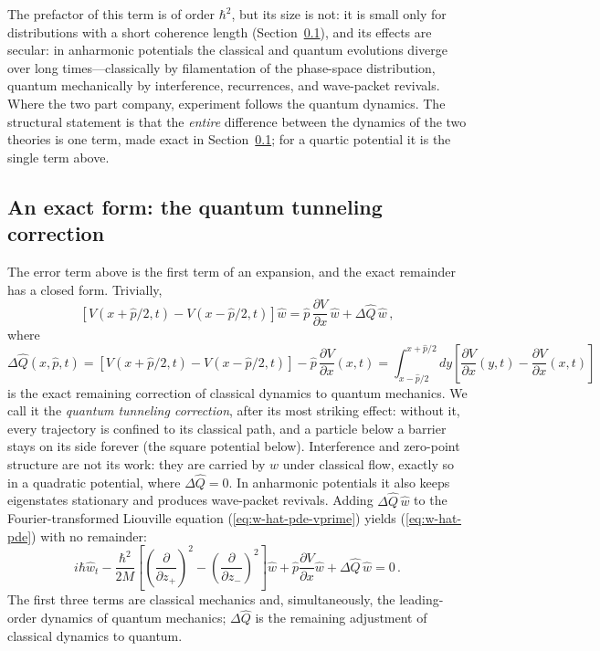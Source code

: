 \documentclass[12pt]{article}
\begin{document}
The prefactor of this term is of order $\hbar^2$, but its size is not: it is small only for distributions with a short coherence length (Section~\ref{sec:exact-correction}), and its effects are secular: in anharmonic potentials the classical and quantum evolutions diverge over long times---classically by filamentation of the phase-space distribution, quantum mechanically by interference, recurrences, and wave-packet revivals.  Where the two part company, experiment follows the quantum dynamics.  The structural statement is that the \emph{entire} difference between the dynamics of the two theories is one term, made exact in Section~\ref{sec:exact-correction}; for a quartic potential it is the single term above.

\subsection{An exact form: the quantum tunneling correction}\label{sec:exact-correction}
The error term above is the first term of an expansion, and the exact remainder has a closed form.  Trivially,
\begin{equation}\label{eq:dq-identity}
\left[V(x+\hat{p}/2,t) - V(x-\hat{p}/2,t)\right]\hat{w} = \hat{p}\,\frac{\partial V}{\partial x}\,\hat{w} + \Delta\hat{Q}\,\hat{w} \,,
\end{equation}
where
\begin{equation}\label{eq:dq}
\Delta\hat{Q}(x,\hat{p},t) = \left[V(x+\hat{p}/2,t) - V(x-\hat{p}/2,t)\right] - \hat{p}\,\frac{\partial V}{\partial x}(x,t)
= \int_{x-\hat{p}/2}^{x+\hat{p}/2} dy \left[\frac{\partial V}{\partial x}(y,t) - \frac{\partial V}{\partial x}(x,t)\right]
\end{equation}
is the exact remaining correction of classical dynamics to quantum mechanics.  We call it the \emph{quantum tunneling correction}, after its most striking effect: without it, every trajectory is confined to its classical path, and a particle below a barrier stays on its side forever (the square potential below).  Interference and zero-point structure are not its work: they are carried by $w$ under classical flow, exactly so in a quadratic potential, where $\Delta\hat{Q} = 0$.  In anharmonic potentials it also keeps eigenstates stationary and produces wave-packet revivals.  Adding $\Delta\hat{Q}\,\hat{w}$ to the Fourier-transformed Liouville equation (\ref{eq:w-hat-pde-vprime}) yields (\ref{eq:w-hat-pde}) with no remainder:
\begin{equation}\label{eq:w-hat-pde-exact}
i\hbar \hat{w}_t - \frac{\hbar^2}{2M}
\left[\left(\frac{\partial}{\partial z_{+}}\right)^2 - \left(\frac{\partial}{\partial z_{-}}\right)^2\right]\hat{w}
+ \hat{p} \frac{\partial V}{\partial x} \hat{w} + \Delta\hat{Q}\,\hat{w} = 0 \,.
\end{equation}
The first three terms are classical mechanics and, simultaneously, the leading-order dynamics of quantum mechanics; $\Delta\hat{Q}$ is the remaining adjustment of classical dynamics to quantum.
\end{document}
